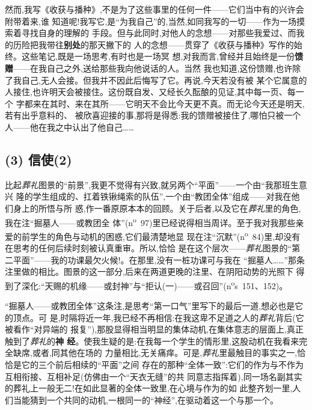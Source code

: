 然而,我写《收获与播种》,不是为了这些事里的任何一件——它们当中有的兴许会附带着来,谁
知道呢!我写它,是“为我自己”的,当然,如同我写的一切——作为一场摸索着寻找自身的理解的
手段。但与此同时,对他人的念想——对那些我爱过、而我的历险把我带往\textbf{别处}的那天撇下的
人的念想——贯穿了《收获与播种》写作的始终。这些笔记,既是一场思考,有时也是一场冥
想,对我而言,曾经并且始终是一份\textbf{馈赠}——在我自己之外,送给那些我向他说话的人。当然
我也知道,这份馈赠,也许除了我自己,无人会接。但我并不因此后悔写了它。再说,今天若没有被
某个它属意的人接住,也许明天会被接住。这份既自发、又经长久酝酿的见证,其中每一页、每一个
字都来在其时、来在其所——它明天不会比今天更不真。而无论今天还是明天,若有出乎意料的、
被欣喜迎接的事,那将是得悉:我的馈赠被接住了,哪怕只被一个人——他在我之中认出了他自己……

\subsection{(3) 信使(2)}   %


比起\emph{葬礼}图景的“前景”,我更不觉得有兴致,就另两个“平面”——一个由“我那班生意兴
隆的学生组成的、扛着铁锹绳索的队伍”,一个由“教团全体”组成——对我在他们身上的所悟与所
惑,作一番原原本本的回顾。关于后者,以及它在\emph{葬礼}里的角色,我在注“掘墓人——或教团全
体”(n\textsuperscript{o}~97)里已经说得相当周详。至于我对我那些亲爱的前学生的角色与动机的困惑,它们最清楚地显
现在注“沉默”(n\textsuperscript{o}~84)里,却\dmark{}没有在思考的任何后续时刻被认真重审。所以,恰恰
是在这个层次——\emph{葬礼}图景的“第二平面”——我的功课最欠火候!。在那里,没有一桩功课可与我在
“掘墓人……”那条注里做的相比。图景的这一部分,后来在两道更晚的注里、在阴阳动势的光照下
得到了深化:“天赐的机缘——或封神”与“拒认(一)——或召回”(n\textsuperscript{o}s~151、152)。

“掘墓人——或教团全体”这条注,是思考“第一口气”里写下的最后一道,想必也是它的顶点。可
是,时隔将近一年,我已经不再相信:在我这卑不足道之人的\emph{葬礼}背后(它被看作“对异端的
报复”),那股显得相当明显的集体动机,在集体意志的层面上,真正触到了\emph{葬礼}的\textbf{神
经}。使我生疑的是:在我每一个学生的情形里,这股动机在我看来完全缺席,或者,同其他在场的
力量相比,无关痛痒。可是,\emph{葬礼}里最触目的事实之一,恰恰是它的三个前后相续的“平面”之间
存在的那种“全体一致”:它们的作为与不作为互相衔接、互相补足(仿佛由一个“天衣无缝”的共
同意志指挥着),同一场名副其实的葬礼上一般无二!在如此显著的全体一致里,在心境与作为的如
此整齐划一里,人们当能猜到一个共同的动机,一根同一的“神经”,在驱动着这一个与那一个。

